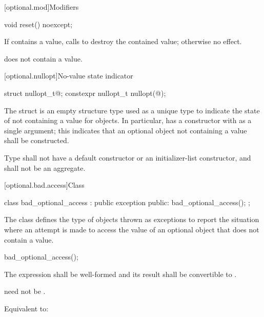 [optional.mod]{Modifiers}

%
\begin{itemdecl}
void reset() noexcept;
\end{itemdecl}

\begin{itemdescr}
\pnum
\effects
If  contains a value, calls  to destroy the contained value;
otherwise no effect.

\pnum
\postconditions
{} does not contain a value.
\end{itemdescr}

[optional.nullopt]{No-value state indicator}

%
%
\begin{itemdecl}
struct nullopt_t{@\seebelow@};
constexpr nullopt_t nullopt(@\unspec@);
\end{itemdecl}

\pnum
The struct  is an empty structure type used as a unique type to indicate the state of not containing a value for  objects.
In particular,  has a constructor with  as a single argument;
this indicates that an optional object not containing a value shall be constructed.

\pnum
Type  shall not have a default constructor or an initializer-list constructor, and shall not be an aggregate.

[optional.bad.access]{Class }

\begin{codeblock}
class bad_optional_access : public exception {
public:
  bad_optional_access();
};
\end{codeblock}

\pnum
The class  defines the type of objects thrown as exceptions to report the situation where an attempt is made to access the value of an optional object that does not contain a value.

%
%
\begin{itemdecl}
bad_optional_access();
\end{itemdecl}

\begin{itemdescr}
\pnum
\requires
The expression  shall be well-formed and
its result shall be convertible to .
\begin{note}  need not be . \end{note}

\pnum
\effects
Equivalent to: 
\end{itemdescr}

